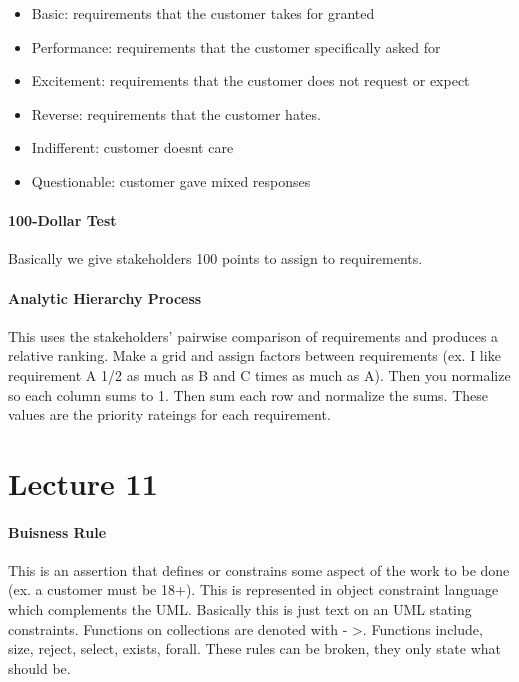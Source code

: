 \documentclass[12pt]{article}
\begin{document}
\begin{itemize}
	\item Basic: requirements that the customer takes for granted
	\item Performance: requirements that the customer specifically asked for
	\item Excitement: requirements that the customer does not request or expect
	\item Reverse: requirements that the customer hates.
	\item Indifferent: customer doesnt care
	\item Questionable: customer gave mixed responses
\end{itemize}

\paragraph{100-Dollar Test} 
\label{par:100_dollar_test}
Basically we give stakeholders 100 points to assign to requirements.

\paragraph{Analytic Hierarchy Process} 
\label{par:analytic_hierarchy_process}
This uses the stakeholders' pairwise comparison of requirements and produces a relative ranking. Make a grid and assign factors between requirements (ex. I like requirement A 1/2 as much as B and C  times as much as A). Then you normalize so each column sums to 1. Then sum each row and normalize the sums. These values are the priority rateings for each requirement.


\section*{Lecture 11}
\label{sec:lecture_11}
\paragraph{Buisness Rule} 
\label{par:buisness_rule}
This is an assertion that defines or constrains some aspect of the work to be done (ex. a customer must be 18+). This is represented in object constraint language which complements the UML. Basically this is just text on an UML stating constraints. Functions on collections are denoted with - >.  Functions include, size, reject, select, exists, forall. These rules can be broken, they only state what should be. 
\end{document}
